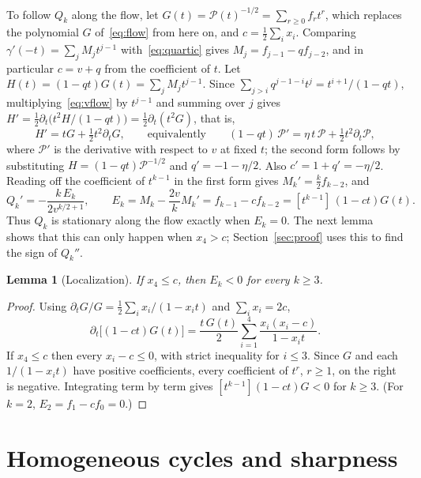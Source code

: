\documentclass[11pt]{article}
\newtheorem{lemma}[theorem]{Lemma}
\theoremstyle{remark}
\begin{document}
To follow $Q_k$ along the flow, let $G(t)=\mathcal P(t)^{-1/2}=\sum_{r\ge0}f_rt^r$,
which replaces the polynomial $G$ of~\eqref{eq:flow} from here on,
and $c=\frac12\sum_ix_i$. Comparing $\gamma'(-t)=\sum_jM_jt^{j-1}$
with~\eqref{eq:quartic} gives $M_j=f_{j-1}-qf_{j-2}$, and in particular
$c=v+q$ from the coefficient of $t$. Let $H(t)=(1-qt)G(t)=\sum_jM_jt^{j-1}$.
Since $\sum_{j>i}q^{j-1-i}t^j=t^{i+1}/(1-qt)$, multiplying~\eqref{eq:vflow}
by $t^{j-1}$ and summing over $j$ gives
$H'=\frac12\partial_t\bigl(t^2H/(1-qt)\bigr)=\frac12\partial_t(t^2G)$, that is,
\begin{equation}\label{eq:Hv}
H'=tG+\tfrac12t^2\partial_tG,\qquad\text{equivalently}\qquad
(1-qt)\,\mathcal P'=\eta\,t\,\mathcal P+\tfrac12t^2\partial_t\mathcal P,
\end{equation}
where $\mathcal P'$ is the derivative with respect to $v$ at fixed $t$; the
second form follows by substituting $H=(1-qt)\mathcal P^{-1/2}$ and
$q'=-1-\eta/2$. Also $c'=1+q'=-\eta/2$. Reading off the coefficient of
$t^{k-1}$ in the first form gives $M_k'=\frac k2f_{k-2}$, and
\begin{equation}\label{eq:Ek}
Q_k'=-\frac{k\,E_k}{2v^{k/2+1}},\qquad
E_k=M_k-\frac{2v}kM_k'=f_{k-1}-cf_{k-2}=[t^{k-1}]\,(1-ct)G(t).
\end{equation}
Thus $Q_k$ is stationary along the flow exactly when $E_k=0$. The next lemma
shows that this can only happen when $x_4>c$; Section~\ref{sec:proof} uses
this to find the sign of $Q_k''$.

\begin{lemma}[Localization]\label{lem:local}
If $x_4\le c$, then $E_k<0$ for every $k\ge3$.
\end{lemma}

\begin{proof}
Using $\partial_tG/G=\frac12\sum_ix_i/(1-x_it)$ and $\sum_ix_i=2c$,
\[
\partial_t\bigl[(1-ct)G(t)\bigr]=\frac{t\,G(t)}2\sum_{i=1}^4
\frac{x_i(x_i-c)}{1-x_it}.
\]
If $x_4\le c$ then every $x_i-c\le0$, with strict inequality for $i\le3$.
Since $G$ and each $1/(1-x_it)$ have positive coefficients, every
coefficient of $t^r$, $r\ge1$, on the right is negative. Integrating term
by term gives $[t^{k-1}](1-ct)G<0$ for $k\ge3$. (For $k=2$,
$E_2=f_1-cf_0=0$.)
\end{proof}

\section{Homogeneous cycles and sharpness}\label{sec:homog}
\end{document}
